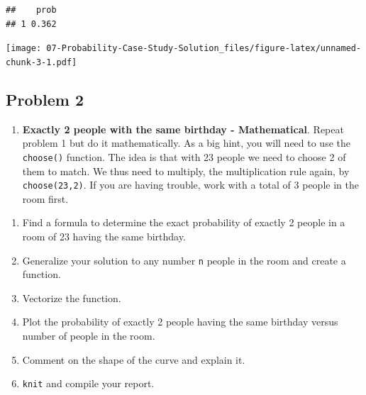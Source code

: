 \documentclass[
]{book}
\newenvironment{Shaded}{\begin{snugshade}}{\end{snugshade}}
\newcommand{\DataTypeTok}[1]{\textcolor[rgb]{0.13,0.29,0.53}{#1}}
\newcommand{\DecValTok}[1]{\textcolor[rgb]{0.00,0.00,0.81}{#1}}
\newcommand{\KeywordTok}[1]{\textcolor[rgb]{0.13,0.29,0.53}{\textbf{#1}}}
\newcommand{\NormalTok}[1]{#1}
\newcommand{\OperatorTok}[1]{\textcolor[rgb]{0.81,0.36,0.00}{\textbf{#1}}}
\newcommand{\OtherTok}[1]{\textcolor[rgb]{0.56,0.35,0.01}{#1}}
\newcommand{\StringTok}[1]{\textcolor[rgb]{0.31,0.60,0.02}{#1}}
\providecommand{\tightlist}{%
  \setlength{\itemsep}{0pt}\setlength{\parskip}{0pt}}
\begin{document}
\begin{verbatim}
##    prob
## 1 0.362
\end{verbatim}

\begin{Shaded}
\end{Shaded}

\texttt{[image: 07-Probability-Case-Study-Solution\_files/figure-latex/unnamed-chunk-3-1.pdf]}

\hypertarget{problem-2-6}{%
\subsection{Problem 2}\label{problem-2-6}}

\begin{enumerate}
\def\labelenumi{\arabic{enumi}.}
\setcounter{enumi}{1}
\tightlist
\item
  \textbf{Exactly 2 people with the same birthday - Mathematical}. Repeat problem 1 but do it mathematically. As a big hint, you will need to use the \texttt{choose()} function. The idea is that with 23 people we need to choose 2 of them to match. We thus need to multiply, the multiplication rule again, by \texttt{choose(23,2)}. If you are having trouble, work with a total of 3 people in the room first.
\end{enumerate}

\begin{enumerate}
\def\labelenumi{\alph{enumi}.}
\item
  Find a formula to determine the exact probability of exactly 2 people in a room of 23 having the same birthday.
\item
  Generalize your solution to any number \texttt{n} people in the room and create a function.
\item
  Vectorize the function.
\item
  Plot the probability of exactly 2 people having the same birthday versus number of people in the room.
\item
  Comment on the shape of the curve and explain it.
\item
  \texttt{knit} and compile your report.
\end{enumerate}
\end{document}
